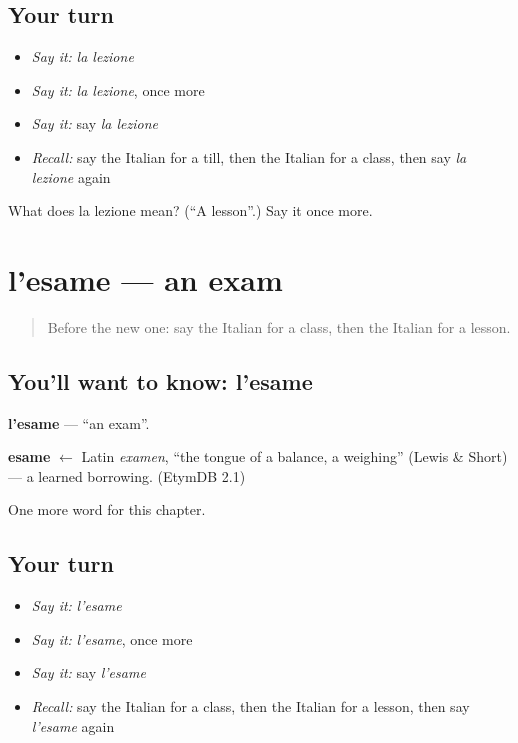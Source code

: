 \subsection*{Your turn}
\begin{itemize}
\raggedright
  \item \emph{Say it:} \emph{la lezione}
  \item \emph{Say it:} \emph{la lezione}, once more
  \item \emph{Say it:} say \emph{la lezione}
  \item \emph{Recall:} say the Italian for a till, then the Italian for a class, then say \emph{la lezione} again
\end{itemize}

\begin{tcolorbox}[breakable,colback=teal!4,colframe=teal!35!black,title={Before you move on}]
What does la lezione mean? (\textquotedblleft{}A lesson\textquotedblright{}.) Say it once more.
\end{tcolorbox}
\section[l'esame]{l'esame — an exam}

\label{lesson:IT-C114-esame}



\begin{quote}
Before the new one: say the Italian for a class, then the Italian for a lesson.
\end{quote}

\subsection*{You'll want to know: l'esame}
\textbf{l'esame} — \textquotedblleft{}an exam\textquotedblright{}.

\begin{cousinweb}
\textbf{esame} $\leftarrow$ Latin \emph{examen}, \textquotedblleft{}the tongue of a balance, a weighing\textquotedblright{} (Lewis \& Short) — a learned borrowing. (EtymDB 2.1)
\end{cousinweb}

\begin{grammarlens}[title={What you've built}]
One more word for this chapter.
\end{grammarlens}

\subsection*{Your turn}
\begin{itemize}
\raggedright
  \item \emph{Say it:} \emph{l'esame}
  \item \emph{Say it:} \emph{l'esame}, once more
  \item \emph{Say it:} say \emph{l'esame}
  \item \emph{Recall:} say the Italian for a class, then the Italian for a lesson, then say \emph{l'esame} again
\end{itemize}

